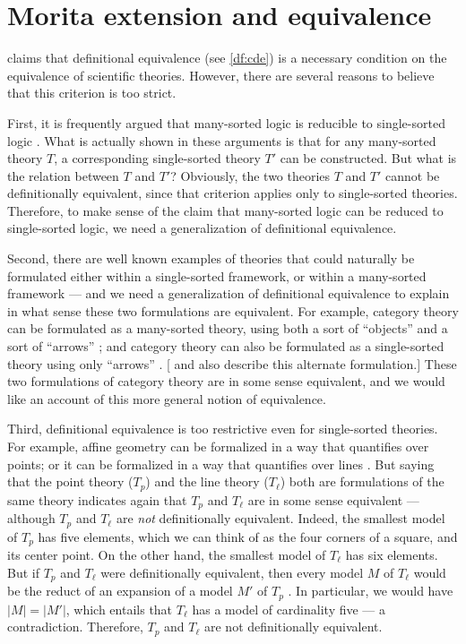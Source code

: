 

\section{Morita extension and equivalence}

\citet{glymour1970} claims that definitional equivalence (see
\ref{df:cde}) is a necessary condition on the equivalence of
scientific theories.  However, there are several reasons to believe
that this criterion is too strict.

First, it is frequently argued that many-sorted logic is reducible to
single-sorted logic \citep[see][]{schmidt1951,manzano-book}.  What is
actually shown in these arguments is that for any many-sorted theory
$T$, a corresponding single-sorted theory $T'$ can be constructed.
But what is the relation between $T$ and $T'$?  Obviously, the two
theories $T$ and $T'$ cannot be definitionally equivalent, since that
criterion applies only to single-sorted theories.  Therefore, to make
sense of the claim that many-sorted logic can be reduced to
single-sorted logic, we need a generalization of definitional
equivalence.  %

Second, there are well known examples of theories that could naturally
be formulated either within a single-sorted framework, or within a
many-sorted framework --- and we need a generalization of definitional
equivalence to explain in what sense these two formulations are
equivalent.  For example, category theory can be formulated as a
many-sorted theory, using both a sort of ``objects'' and a sort of
``arrows'' \citep{eilenbergmaclane1942, eilenbergmaclane1945}; and
category theory can also be formulated as a single-sorted theory using
only ``arrows'' \citep{maclane1948}.  [\citet[p.~5]{freyd1964} and
\citet[p.~9]{cwm} also describe this alternate formulation.]  These
two formulations of category theory are in some sense equivalent, and
we would like an account of this more general notion of equivalence.

Third, definitional equivalence is too restrictive even for
single-sorted theories.  For example, affine geometry can be
formalized in a way that quantifies over points; or it can be
formalized in a way that quantifies over lines
\citep[see][]{schwabhauser1983}.  But saying that the point theory
($T_p$) and the line theory ($T_\ell$) both are formulations of the
same theory indicates again that $T_p$ and $T_\ell$ are in some sense
equivalent --- although $T_p$ and $T_\ell$ are {\it not}
definitionally equivalent.  Indeed, the smallest model of $T_p$ has
five elements, which we can think of as the four corners of a square,
and its center point.  On the other hand, the smallest model of
$T_\ell$ has six elements.  But if $T_p$ and $T_\ell$ were
definitionally equivalent, then every model $M$ of $T_\ell$ would be
the reduct of an expansion of a model $M'$ of $T_p$
\citep{debouvere1965}.  In particular, we would have $|M|=|M'|$, which
entails that $T_\ell$ has a model of cardinality five --- a
contradiction.  Therefore, $T_p$ and $T_\ell$ are not definitionally
equivalent.

